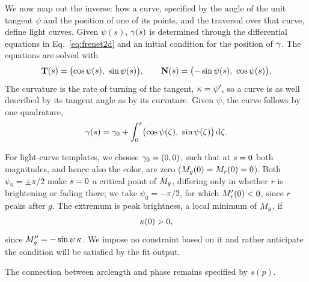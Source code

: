 \documentclass[11pt]{article}
\theoremstyle{plain}
\begin{document}
We now map out the inverse: how a curve, specified by the angle of the unit tangent
$\psi$ and the position of one of its points, and the traversal over that curve,
define light curves.
Given $\psi(s)$, $\gamma(s)$ is determined through the differential equations in
Eq.~\ref{eq:frenet2d} and an initial condition for the position of $\gamma$. The equations are solved with
\begin{equation}
  \tang(\arc) = \bigl(\cos\psi(\arc),\ \sin\psi(\arc)\bigr),
  \qquad
  \norml(\arc) = \bigl(-\sin\psi(\arc),\ \cos\psi(\arc)\bigr),
  \label{eq:tangangle}
\end{equation}
The curvature is the rate of turning of the tangent, $\kappa = \psi'$, so a curve is as
well described by its tangent angle as by its curvature. Given $\psi$, the curve follows by
one quadrature,
\begin{equation}
  \curve(\arc) = \curve_{0} + \int_{{0}}^{\arc}
                  \bigl(\cos\psi(\zeta),\ \sin\psi(\zeta)\bigr)\,\dd\zeta .
                  \label{eq:quadrature}
\end{equation}

For light-curve templates, we choose $\gamma_{0} = (0,0)$, such that at
$s = 0$ both magnitudes, and hence also the color, are zero
($M_{g}(0) = M_{r}(0) = 0$). Both $\psi_{0} = \pm\pi/2$ make $s = 0$ a
critical point of $M_{g}$, differing only in whether $r$ is brightening or fading there;
we take $\psi_{0} = -\pi/2$, for which $M_{r}'(0) < 0$, since $r$ peaks after $g$.
The extremum is peak brightness, a local minimum of $M_{g}$, if
\begin{equation}
  \kappa(0) > 0 ,
  \label{eq:peakcond}
\end{equation}
since $M_{g}'' = -\sin\psi\,\kappa$. We impose no constraint based on it and rather
anticipate the condition will be satisfied by the fit output.

The connection between arclength and phase remains specified by $s(p)$.
\end{document}
